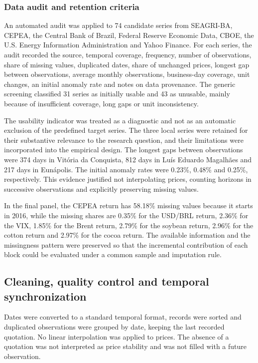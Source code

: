 \documentclass[a4paper,fleqn]{cas-sc}
\begin{document}
\subsubsection{Data audit and retention criteria}
\label{subsec:data_audit}

An automated audit was applied to 74 candidate series from SEAGRI-BA, CEPEA, the Central Bank of Brazil, Federal Reserve Economic Data, CBOE, the U.S. Energy Information Administration and Yahoo Finance. For each series, the audit recorded the source, temporal coverage, frequency, number of observations, share of missing values, duplicated dates, share of unchanged prices, longest gap between observations, average monthly observations, business-day coverage, unit changes, an initial anomaly rate and notes on data provenance. The generic screening classified 31 series as initially usable and 43 as unusable, mainly because of insufficient coverage, long gaps or unit inconsistency.

The usability indicator was treated as a diagnostic and not as an automatic exclusion of the predefined target series. The three local series were retained for their substantive relevance to the research question, and their limitations were incorporated into the empirical design. The longest gaps between observations were 374 days in Vitória da Conquista, 812 days in Luís Eduardo Magalhães and 217 days in Eunápolis. The initial anomaly rates were 0.23\%, 0.48\% and 0.25\%, respectively. This evidence justified not interpolating prices, counting horizons in successive observations and explicitly preserving missing values.

In the final panel, the CEPEA return has 58.18\% missing values because it starts in 2016, while the missing shares are 0.35\% for the USD/BRL return, 2.36\% for the VIX, 1.85\% for the Brent return, 2.79\% for the soybean return, 2.96\% for the cotton return and 2.97\% for the cocoa return. The available information and the missingness pattern were preserved so that the incremental contribution of each block could be evaluated under a common sample and imputation rule.

\subsection{Cleaning, quality control and temporal synchronization}
\label{subsec:data_cleaning}

Dates were converted to a standard temporal format, records were sorted and duplicated observations were grouped by date, keeping the last recorded quotation. No linear interpolation was applied to prices. The absence of a quotation was not interpreted as price stability and was not filled with a future observation.
\end{document}
